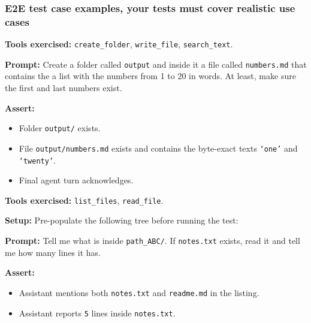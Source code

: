 \documentclass{article}
\begin{document}
\subsubsection*{E2E test case examples, your tests must cover realistic use cases}

\begin{tcolorbox}[fontupper=\ttfamily, title=numbers\_in\_words]
\textbf{Tools exercised:} \texttt{create\_folder}, \texttt{write\_file}, \texttt{search\_text}.

\medskip
\textbf{Prompt:} Create a folder called \texttt{output} and inside it a file called \texttt{numbers.md} that contains the a list with the numbers from 1 to 20 in words. At least, make sure the first and last numbers exist.

\medskip
\textbf{Assert:}
\begin{itemize}
  \item Folder \texttt{output/} exists.
  \item File \texttt{output/numbers.md} exists and contains the byte-exact texts \texttt{`one'} and \texttt{`twenty'}.
  \item Final agent turn acknowledges.
\end{itemize}
\end{tcolorbox}

\begin{tcolorbox}[fontupper=\ttfamily, title=find\_and\_inspect]
\textbf{Tools exercised:} \texttt{list\_files}, \texttt{read\_file}.

\medskip
\textbf{Setup:} Pre-populate the following tree before running the test:
\begin{flushleft}
\end{flushleft}
\textbf{Prompt:} Tell me what is inside \texttt{path\_ABC/}. If \texttt{notes.txt} exists, read it and tell me how many lines it has.

\medskip
\textbf{Assert:}
\begin{itemize}
  \item Assistant mentions both \texttt{notes.txt} and \texttt{readme.md} in the listing.
  \item Assistant reports \texttt{5} lines inside \texttt{notes.txt}.
\end{itemize}
\end{tcolorbox}
\end{document}
